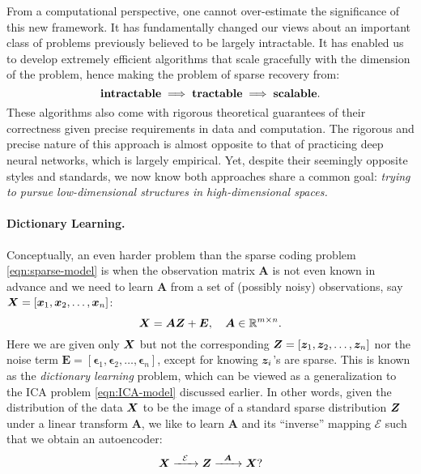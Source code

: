 \documentclass[\toplevelprefix/book-main.tex]{subfiles}
\begin{document}
From a computational perspective, one cannot over-estimate the significance of this new framework. It has fundamentally changed our views about an important class of problems previously believed to be largely intractable. It has enabled us to develop extremely efficient algorithms that scale gracefully with the dimension of the problem, hence making the problem of sparse recovery from:
\begin{equation}
    \mbox{\textbf{intractable}} \;
   \Longrightarrow \; \mbox{\textbf{tractable}} \; \Longrightarrow \; 
   \mbox{\textbf{scalable}}.
\end{equation}
These algorithms also come with rigorous theoretical guarantees of their correctness given precise requirements in data and computation. The rigorous and precise nature of this approach is almost opposite to that of practicing deep neural networks, which is largely empirical. Yet, despite their seemingly opposite styles and standards, we now know both approaches share a common goal: {\em trying to pursue low-dimensional structures in high-dimensional spaces.}

\paragraph{Dictionary Learning.}
Conceptually, an even harder problem than the sparse coding problem \eqref{eqn:sparse-model} is when the observation matrix $\boldsymbol{A}$ is not even known in advance and we need to learn $\boldsymbol{A}$ from a set of (possibly noisy) observations, say $\bm{X} = [\bm{x}_1, \bm{x}_2, \ldots, \bm{x}_n]$:
\begin{equation}
    \bm{X} = \boldsymbol{A} \bm{Z} + \boldsymbol{E}, \quad \boldsymbol{A} \in \mathbb{R}^{m\times n}.
    \label{eqn:dictionary-learning}
\end{equation}
Here we are given only $\bm{X}$ but not the corresponding $\bm{Z} = [\bm{z}_1, \bm{z}_2, \ldots, \bm{z}_n]$ nor the noise term $\boldsymbol{E}= [\boldsymbol{\epsilon}_1, \boldsymbol{\epsilon}_2, \ldots, \boldsymbol{\epsilon}_n]$, except for knowing $\bm{z}_i$'s are sparse. This is known as the {\em dictionary learning} problem, which can be viewed as a generalization to the ICA problem \eqref{eqn:ICA-model} discussed earlier. In other words, given the distribution of the data $\bm{X}$ to be the image of a standard sparse distribution $\bm{Z}$ under a linear transform $\boldsymbol{A}$, we like to learn $\boldsymbol{A}$ and its ``inverse'' mapping $\mathcal{E}$ such that we obtain an autoencoder:
\begin{equation}
    \bm{X}   \xrightarrow{\hspace{2mm} \mathcal{E} \hspace{2mm}}  \bm{Z} \xrightarrow{\hspace{2mm} \boldsymbol{A} \hspace{2mm}} \bm{X}?
       \label{eqn:decoding-DL}
\end{equation}
\end{document}
